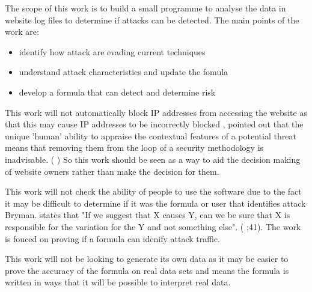 The scope of this work is to build a small programme to analyse the data in website log files to determine if attacks can be detected. The main points of the work are:
\begin{itemize}
    \item identify how attack are evading current techniques 
    \item understand attack characteristics and update the fomula
    \item develop a formula that can detect and determine risk
\end{itemize}

This work will not automatically block IP addresses from accessing the website as that this may cause IP addresses to be incorrectly blocked \citeauthor{TargetedCyberSecurity}, pointed out that the unique 'human' ability to appraise the contextual features of a potential threat means that removing them from the loop of a security methodology is inadvisable. (\cite{TargetedCyberSecurity} ) So this work should be seen as a way to aid the decision making of website owners rather than make the decision for them. 

This work will not check the ability of people to use the software due to the fact it may be difficult to determine if it was the formula or user that identifies attack Bryman. states that "If we suggest that X causes Y, can we be sure that X is responsible for the variation for the Y and not something else". (\citeauthor{bryman_2016} \citeyear{bryman_2016};41). The work is fouced on proving if a formula can idenify attack traffic.

This work will not be looking to generate its own data as it may be easier to prove the accuracy of the formula on real data sets and  means the formula is written in ways that it will be possible to interpret real data.